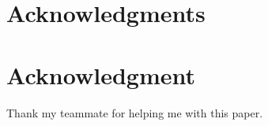 \documentclass[10pt,journal,compsoc]{IEEEtran}
\begin{document}
\ifCLASSOPTIONcompsoc
  \section*{Acknowledgments}
\else
  \section*{Acknowledgment}
\fi

Thank my teammate for helping me with this paper.

\ifCLASSOPTIONcaptionsoff
  \newpage
\fi





%
%
%
%
%



%
\end{document}
